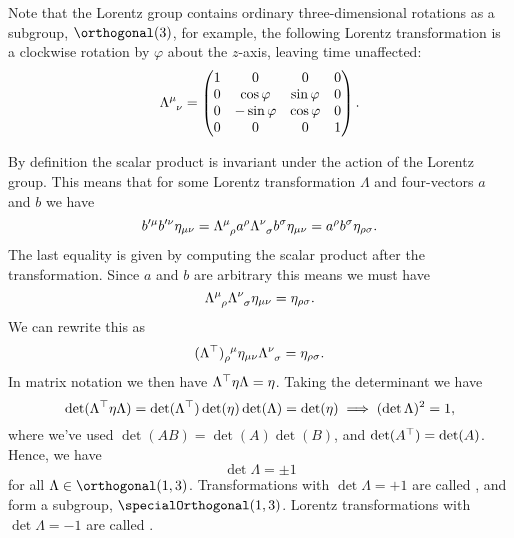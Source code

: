 Note that the Lorentz group contains ordinary three-dimensional rotations as a subgroup, \(\orthogonal(3)\), for example, the following Lorentz transformation is a clockwise rotation by \(\varphi\) about the \(z\)-axis, leaving time unaffected:
\begin{equation}
    \tensor{\Lambda}{^\mu_\nu} = 
    \begin{pmatrix}
        1 & 0 & 0 & 0\\
        0 & \cos\varphi & \sin\varphi & 0\\
        0 & -\sin\varphi & \cos\varphi & 0\\
        0 & 0 & 0 & 1
    \end{pmatrix}
    .
\end{equation}

By definition the scalar product is invariant under the action of the Lorentz group.
This means that for some Lorentz transformation \(\Lambda\) and four-vectors \(a\) and \(b\) we have
\begin{equation}
    b'^\mu b'^\nu \minkowskiMetric_{\mu\nu} = \tensor{\Lambda}{^\mu_\rho} a^\rho \tensor{\Lambda}{^\nu_\sigma} b^\sigma \minkowskiMetric_{\mu\nu} = a^\rho b^\sigma \minkowskiMetric_{\rho\sigma}.
\end{equation}
The last equality is given by computing the scalar product after the transformation.
Since \(a\) and \(b\) are arbitrary this means we must have
\begin{equation}\label{eqn:lorentz transformation of metric}
    \tensor{\Lambda}{^\mu_\rho} \tensor{\Lambda}{^\nu_\sigma} \minkowskiMetric_{\mu\nu} = \minkowskiMetric_{\rho\sigma}.
\end{equation}
We can rewrite this as
\begin{equation}
    \tensor{(\Lambda^\trans)}{_\rho^\mu} \minkowskiMetric_{\mu\nu} \tensor{\Lambda}{^\nu_\sigma} = \minkowskiMetric_{\rho\sigma}.
\end{equation}
In matrix notation we then have \(\Lambda^{{\top}} \eta \Lambda = \eta\).
Taking the determinant we have
\begin{equation}
    \det(\Lambda^{\top} \eta \Lambda) = \det(\Lambda^{\top}) \det(\eta) \det(\Lambda) = \det(\eta) \implies (\det\Lambda)^2 = 1,
\end{equation}
where we've used \(\det(AB) = \det(A)\det(B)\), and \(\det(A^{\top}) = \det(A)\).
Hence, we have
\begin{equation}
    \det \Lambda = \pm 1
\end{equation}
for all \(\Lambda \in \orthogonal(1, 3)\).
Transformations with \(\det \Lambda = +1\) are called , and form a subgroup, \(\specialOrthogonal(1, 3)\).
Lorentz transformations with \(\det \Lambda = -1\) are called .

